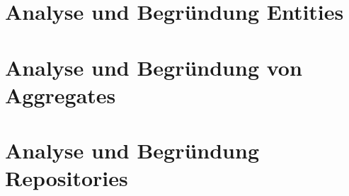 \documentclass[12pt]{article}
\begin{document}
\newpage

\section{Analyse und Begründung Entities}

\newpage

\section{Analyse und Begründung von Aggregates}

\newpage

\section{Analyse und Begründung Repositories}
\end{document}
